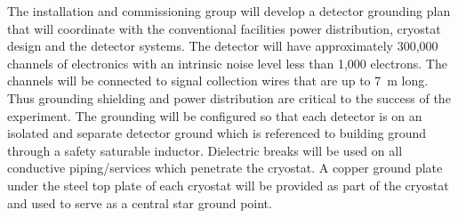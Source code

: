 The installation and commissioning group will develop a detector
grounding plan that will coordinate with the conventional facilities
power distribution, cryostat design and the detector systems.  The
detector will have approximately 300,000 channels of electronics with
an intrinsic noise level less than 1,000 electrons. The channels will
be connected to signal collection wires that are up to 7~m long. Thus
grounding shielding and power distribution are critical to the success
of the experiment. The grounding will be configured so that each
detector is on an isolated and separate detector ground which is
referenced to building ground through a safety saturable inductor.
Dielectric breaks will be used on all conductive piping/services which
penetrate the cryostat.  A copper ground plate under the steel top
plate of each cryostat will be provided as part of the cryostat and
used to serve as a central star ground point.



